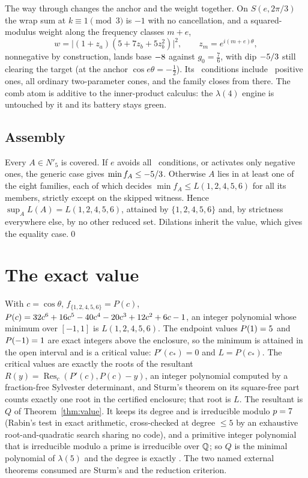 \documentclass[11pt]{article}
\newcommand{\Lf}{L(1,2,4,5,6)}
\begin{document}
The way through changes the anchor and the weight together. On $S(e,2\pi/3)$ the wrap sum at $k\equiv1\pmod3$ is $-1$ with no cancellation, and a squared-modulus weight along the frequency classes $m+e$,
\[
w=\bigl|(1+z_a)(5+7z_b+5z_b^2)\bigr|^2,\qquad z_m=e^{i(m+e)\theta},
\]
nonnegative by construction, lands base $-8$ against $g_0=\frac76$, with dip $-5/3$ still clearing the target (at the anchor $\cos e\theta=-\frac12$). Its \CoreConditions\ conditions include \CorePositive\ positive ones, all ordinary two-parameter cones, and the family closes from there. The comb atom is additive to the inner-product calculus: the $\lambda(4)$ engine is untouched by it and its battery stays green.

\subsection{Assembly}

Every $A\in N'_5$ is covered. If $e$ avoids all \GenConditions\ conditions, or activates only negative ones, the generic case gives $\min f_A\le-5/3$. Otherwise $A$ lies in at least one of the eight families, each of which decides $\min f_A\le\Lf$ for all its members, strictly except on the skipped witness. Hence $\sup_AL(A)=\Lf$, attained by $\{1,2,4,5,6\}$ and, by strictness everywhere else, by no other reduced set. Dilations inherit the value, which gives the equality case.\qed

\section{The exact value}\label{sec:value}

With $c=\cos\theta$, $f_{\{1,2,4,5,6\}}=P(c)$, $P(c)=32c^{6} + 16c^{5} - 40c^{4} - 20c^{3} + 12c^{2} + 6c - 1$, an integer polynomial whose minimum over $[-1,1]$ is $\Lf$. The endpoint values $P(1)=5$ and $P(-1)=1$ are exact integers above the enclosure, so the minimum is attained in the open interval and is a critical value: $P'(c_*)=0$ and $L=P(c_*)$. The critical values are exactly the roots of the resultant $R(y)=\operatorname{Res}_c(P'(c),P(c)-y)$, an integer polynomial computed by a fraction-free Sylvester determinant, and Sturm's theorem on its square-free part counts exactly one root in the certified enclosure; that root is $L$. The resultant is $Q$ of Theorem~\ref{thm:value}. It keeps its degree and is irreducible modulo $p=7$ (Rabin's test in exact arithmetic, cross-checked at degree $\le5$ by an exhaustive root-and-quadratic search sharing no code), and a primitive integer polynomial that is irreducible modulo a prime is irreducible over $\mathbb{Q}$; so $Q$ is the minimal polynomial of $\lambda(5)$ and the degree is exactly \QuinticDegree. The two named external theorems consumed are Sturm's and the reduction criterion.
\end{document}
